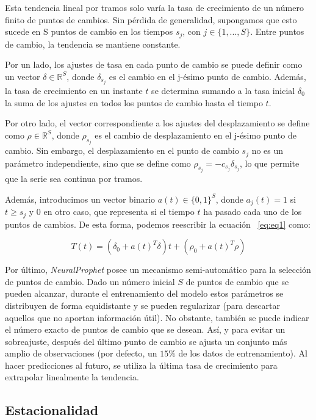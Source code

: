 \documentclass[12pt,twoside]{article}
\begin{document}
Esta tendencia lineal por tramos solo varía la tasa de crecimiento de un número finito de puntos de cambios. Sin pérdida de generalidad, supongamos que esto sucede en S puntos de cambio en los tiempos $s_j$, con $j\in \{1,...,S\}$. Entre puntos de cambio, la tendencia se mantiene constante. 

Por un lado, los ajustes de tasa en cada punto de cambio se puede definir como un vector $\delta \in \mathbb{R}^S$, donde $\delta_{s_j}$ es el cambio en el j-ésimo punto de cambio. Además, la tasa de crecimiento en un instante $t$ se determina sumando a la tasa inicial $\delta_0$ la suma de los ajustes en todos los puntos de cambio hasta el tiempo $t$.

Por otro lado, el vector correspondiente a los ajustes del desplazamiento se define como $\rho \in \mathbb{R}^S$, donde $\rho_{s_j}$ es el cambio de desplazamiento en el j-ésimo punto de cambio. Sin embargo, el desplazamiento en el punto de cambio $s_j$ no es un parámetro independiente, sino que se define como $\rho_{s_j} = -c_{s_j} \delta_{s_j}$, lo que permite que la serie sea continua por tramos.

Además, introducimos un vector binario $a(t) \in \{0,1\}^S$, donde $a_j(t) = 1$ si $t\geq s_j$ y $0$ en otro caso, que representa si el tiempo $t$ ha pasado cada uno de los puntos de cambios. De esta forma, podemos reescribir la ecuación ~\ref{eq:eq1} como:

\begin{equation}
T(t) = (\delta_0 + a(t)^T \delta)t + (\rho_0 + a(t)^T\rho)
\end{equation}

Por último, \textit{NeuralProphet} posee un mecanismo semi-automático para la selección de puntos de cambio. Dado un número inicial $S$ de puntos de cambio que se pueden alcanzar, durante el entrenamiento del modelo  estos parámetros se distribuyen de forma equidistante y se pueden regularizar (para descartar aquellos que no aportan información útil). No obstante, también se puede indicar el número exacto de puntos de cambio que se desean. Así, y para evitar un sobreajuste, después del último punto de cambio se ajusta un conjunto más amplio de observaciones (por defecto, un $15\%$ de los datos de entrenamiento). Al hacer predicciones al futuro, se utiliza la última tasa de crecimiento para extrapolar linealmente la tendencia.


\subsection{Estacionalidad}\label{sec:23}
\end{document}
